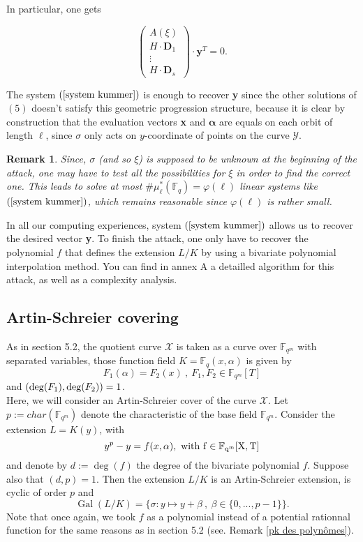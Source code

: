\documentclass[10pt]{article}
\newtheorem{rq1}[thm]{Remark}
\newcommand{\s}{\vspace{0.3cm}}
\newcommand{\cd}{\cdot}
\newcommand{\fqm}{\mathbb{F}_{q^m}}
\newcommand{\fq}{\mathbb{F}_q}
\newcommand{\X}{\mathcal{X}}
\newcommand{\Y}{\mathcal{Y}}
\newcommand{\Gal}{\operatorname{Gal}}
\begin{document}
In particular, one gets


\begin{equation} \label{system kummer}
\begin{pmatrix}
A(\xi) \\
H \cd \textbf{D}_1 \\
\vdots \\
H \cd \textbf{D}_s
\end{pmatrix}
\cd \textbf{y}^T = 0.
\end{equation}

The system $(\ref{system kummer})$ is enough to recover \textbf{y} since the other solutions of $(5)$ doesn't satisfy this geometric progression structure, because it is clear by construction that the evaluation vectors \textbf{x} and $\boldsymbol{\alpha}$ are equals on each orbit of length $\ell$, since $\sigma$ only acts on $y$-coordinate of points on the curve $\Y$. 

\s

\begin{rq1} \rm
Since, $\sigma$ (and so $\xi$) is supposed to be unknown at the beginning of the attack, one may have to test all the possibilities for $\xi$ in order to find the correct one. This leads to solve at most $\#\mu^*_{\ell}(\fq) = \varphi(\ell)$ linear systems like $(\ref{system kummer})$, which remains reasonable since $\varphi(\ell)$ is rather small.
\end{rq1}

\s

In all our computing experiences, system $(\ref{system kummer})$ allows us to recover the desired vector \textbf{y}. To finish the attack, one only have to recover the polynomial $f$ that defines the extension $L/K$ by using a bivariate polynomial interpolation method. You can find in annex A a detailled algorithm for this attack, as well as a complexity analysis.

\s


\subsection{Artin-Schreier covering}

\s

As in section 5.2, the quotient curve $\X$ is taken as a curve over $\fqm$ with separated variables, those function field $K = \fq(x,\alpha)$ is given by 
\[F_1(\alpha) = F_2(x) \ , \ F_1,F_2 \in \fqm[T]\]
and $(\deg(F_1),\deg(F_{\rm 2}))=1$. \\ 
Here, we will consider an Artin-Schreier cover of the curve $\X$.
Let $p:=char(\fqm)$ denote the characteristic of the base field $\fqm$. Consider the extension $L=K(y)$, with
\[y^p-y = f(x,\alpha) , \ \rm with  \ f \in \fqm[X,T]\]
and denote by $d:=\deg(f)$ the degree of the bivariate polynomial $f$. Suppose also that $(d,p)=1$. Then the extension $L/K$ is an Artin-Schreier extension, is cyclic of order $p$ and 
\[\Gal(L/K) = \{ \sigma : y \mapsto y + \beta \ , \ \beta \in \{0,...,p-1\}\}.\]
Note that once again, we took $f$ as a polynomial instead of a potential rationnal function for the same reasons as in section 5.2 (see. Remark \ref{pk des polynômes}).
\end{document}
